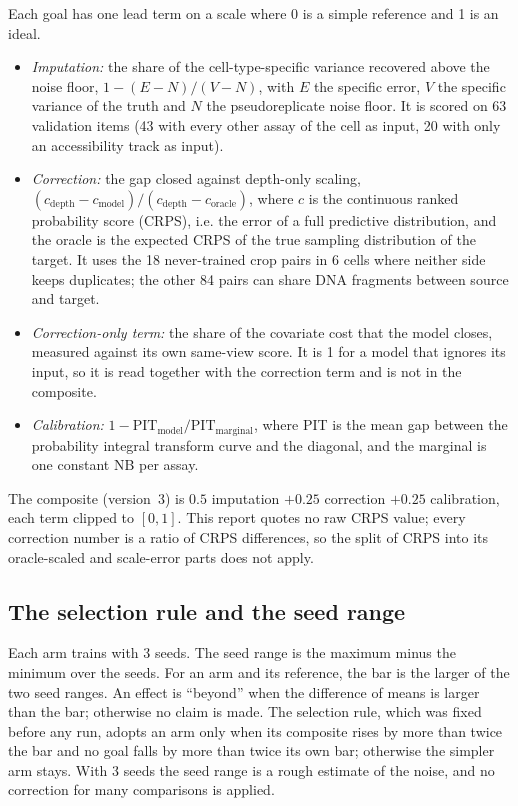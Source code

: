 \documentclass[pdflatex,sn-mathphys-num]{sn-jnl}
\newcommand{\lit}[1]{#1}
\newcommand{\cl}[1]{#1}
\newcommand{\nCleanCells}{6}
\newcommand{\nCleanPairs}{18}
\newcommand{\nDupPairs}{84}
\newcommand{\nItems}{63}
\newcommand{\nItemsAcc}{20}
\newcommand{\nItemsLoao}{43}
\begin{document}
\cl{Each goal has one lead term on a scale where \lit{0} is a simple reference and \lit{1} is an ideal.}
\begin{itemize}
\item \cl{\textit{Imputation:} the share of the cell-type-specific variance recovered above the noise floor, $\lit{1} - (E - N)/(V - N)$, with $E$ the specific error, $V$ the specific variance of the truth and $N$ the pseudoreplicate noise floor. It is scored on \nItems{} validation items (\nItemsLoao{} with every other assay of the cell as input, \nItemsAcc{} with only an accessibility track as input).}
\item \cl{\textit{Correction:} the gap closed against depth-only scaling, $(c_{\text{depth}} - c_{\text{model}})/(c_{\text{depth}} - c_{\text{oracle}})$, where $c$ is the continuous ranked probability score (CRPS), i.e. the error of a full predictive distribution, and the oracle is the expected CRPS of the true sampling distribution of the target. It uses the \nCleanPairs{} never-trained crop pairs in \nCleanCells{} cells where neither side keeps duplicates; the other \nDupPairs{} pairs can share DNA fragments between source and target.}
\item \cl{\textit{Correction-only term:} the share of the covariate cost that the model closes, measured against its own same-view score. It is \lit{1} for a model that ignores its input, so it is read together with the correction term and is not in the composite.}
\item \cl{\textit{Calibration:} $\lit{1} - \text{PIT}_{\text{model}}/\text{PIT}_{\text{marginal}}$, where PIT is the mean gap between the probability integral transform curve and the diagonal, and the marginal is one constant NB per assay.}
\end{itemize}
\cl{The composite (version~\lit{3}) is $\lit{0.5}$ imputation $+ \lit{0.25}$ correction $+ \lit{0.25}$ calibration, each term clipped to $[\lit{0}, \lit{1}]$. This report quotes no raw CRPS value; every correction number is a ratio of CRPS differences, so the split of CRPS into its oracle-scaled and scale-error parts does not apply.}

\subsection{The selection rule and the seed range}

\cl{Each arm trains with \lit{3} seeds. The seed range is the maximum minus the minimum over the seeds. For an arm and its reference, the bar is the larger of the two seed ranges. An effect is ``beyond'' when the difference of means is larger than the bar; otherwise no claim is made. The selection rule, which was fixed before any run, adopts an arm only when its composite rises by more than twice the bar and no goal falls by more than twice its own bar; otherwise the simpler arm stays. With \lit{3} seeds the seed range is a rough estimate of the noise, and no correction for many comparisons is applied.}
\end{document}
